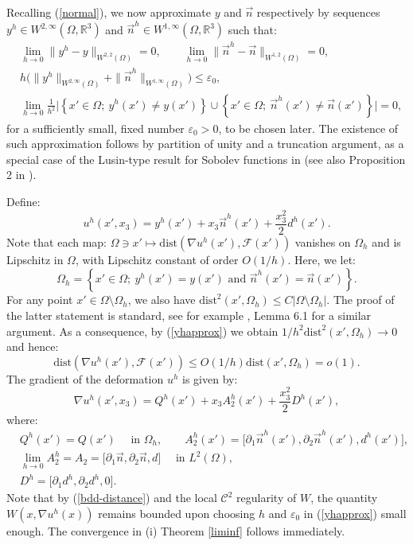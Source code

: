 \documentclass[leqno,twoside, 11pt]{amsart}
\theoremstyle{plain}
\theoremstyle{definition}
\numberwithin{equation}{section}
\numberwithin{figure}{section}
\begin{document}
Recalling (\ref{normal}), we now approximate $y$ and $\vec n$ respectively by sequences 
$y^h\in W^{2,\infty}(\Omega,\mathbb{R}^3)$  and 
$\vec n^h \in W^{1,\infty} (\Omega, {\mathbb R}^3)$ such that:
\begin{equation}\label{yhapprox}
\begin{split}
& \lim_{h\to 0} \|y^h - y\|_{W^{2,2}(\Omega)} = 0, \qquad 
\lim_{h\to 0} \|\vec n^h - \vec n\|_{W^{1,2}(\Omega)} =0, \\ & 
h\Big ( \|y^h\|_{W^{2,\infty}(\Omega)} + \|\vec n^h\|_{W^{1,\infty}(\Omega)}\Big ) 
\leq \varepsilon_0,\\
&  \lim_{h\to 0}\frac{1}{h^2} \Big|\left\{x'\in \Omega; ~ y^h(x') \neq y(x')\right\} 
\cup \left\{x'\in \Omega; ~ \vec n^h(x') \neq \vec n(x')\right\}\Big| =0,
\end{split}
\end{equation}  
for a sufficiently small, fixed number $\varepsilon_0>0$, to be chosen later.
The existence of such approximation follows by partition of unity and a truncation
argument, as a special case of the Lusin-type result for Sobolev functions 
in \cite{Liu50} (see also Proposition 2 in \cite{FJMhier}).  

Define:
\begin{equation}\label{recseq}
u^h(x', x_3) = y^h(x') + x_3 \vec n^h(x') + \frac{x_3^2}{2} d^h(x').
\end{equation}
Note that each map: 
$\Omega\ni x'\mapsto \mbox{dist}(\nabla u^h(x'), \mathcal F(x'))$ 
vanishes on $\Omega_h$ and is 
Lipschitz in $\Omega$, with Lipschitz constant of order $O(1/h)$.
Here, we let:
$$\Omega_h= \left\{x'\in \Omega; ~ y^h(x') = y(x') \mbox{ and } 
\vec n^h(x') =\vec n(x') \right\}.$$ 
For any point $x'\in \Omega \setminus \Omega_h$, 
we also have $\mbox{dist}^2 (x', \Omega_h) \leq C |\Omega \setminus \Omega_h|$. 
The proof of the latter statement is standard, see for example \cite{lemopa1}, 
Lemma 6.1 for a similar argument. As a consequence, by (\ref{yhapprox}) we obtain 
$1/h^2 \mbox{dist}^2 (x', \Omega_h) \to 0$ and hence: 
\begin{equation}\label{bdd-distance}
\mbox{dist}(\nabla u^h(x'), \mathcal F(x')) \leq O(1/h) \mbox{dist}(x', \Omega_h)  
= o(1).
\end{equation}  
The gradient of the deformation $u^h$ is given by:
$$\nabla u^h(x',x_3) = Q^h(x') + x_3 A_2^h(x') + \frac {x_3^2}{2} D^h(x'), $$
where:  
\begin{equation*}
\begin{split}
&  Q^h(x') = Q(x') \quad \mbox{ in } \Omega_h, \qquad 
A_2^h(x') = \Big[\partial_1 \vec n^h(x'),\partial_2 \vec n^h(x'), d^h(x')\Big], \\ 
& \lim_{h\to 0} A_2^h = A_2 =  
\Big[\partial_1\vec n, \partial_2\vec n, d\Big] \quad \mbox{ in } L^2(\Omega), \\
& D^h = \Big [\partial_1 d^h, \partial_2 d^h, 0 \Big ]. 
\end{split} 
\end{equation*}  
Note that by (\ref{bdd-distance}) and the local $\mathcal{C}^2$ regularity of $W$, 
the quantity $W(x,\nabla u^h(x))$ remains bounded upon
choosing $h$ and $\varepsilon_0$ in (\ref{yhapprox}) small enough. 
The convergence in (i) Theorem \ref{liminf} follows immediately. 
\end{document}
